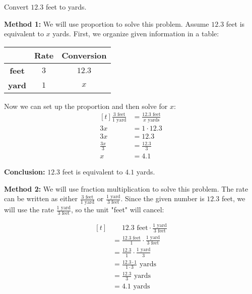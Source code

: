 \begin{myexample}
Convert $12.3$ feet to yards.
\end{myexample}
\begin{solution}
\textbf{Method 1:} We will use proportion to solve this problem. Assume $12.3$ feet is equivalent to $x$ yards. First, we organize given information in a table:
\begin{center}
\begin{tabular}{ | c | c | c | }
	\hline
    	& \textbf{Rate} & \textbf{Conversion} \\ \hline
  \textbf{feet} & $3$ & $12.3$ \\ \hline
  \textbf{yard} & $1$ & $x$ \\ \hline
\end{tabular}
\end{center}

Now we can set up the proportion and then solve for $x$:
\[
\begin{aligned}[t] 
	\frac{3 \text{ feet}}{1 \text{ yard}} &= \frac{12.3 \text{ feet}}{x \text{ yards}} \\
	3x &= 1\cdot12.3 \\ 
	3x &= 12.3 \\
	\frac{3x}{3} &= \frac{12.3}{3} \\ 
	x &= 4.1
\end{aligned}
\]

\textbf{Conclusion:} $12.3$ feet is equivalent to $4.1$ yards.

\textbf{Method 2:} We will use fraction multiplication to solve this problem. The rate can be written as either $\frac{3 \text{ feet}}{1 \text{ yard}}$ or $\frac{1 \text{ yard}}{3 \text{ feet}}$. Since the given number is $12.3$ feet, we will use the rate $\frac{1 \text{ yard}}{3 \text{ feet}}$, so the unit "feet" will cancel:

\[
\begin{aligned}[t]
	&\phantom{{}=}12.3 \text{ feet} \cdot \frac{1 \text{ yard}}{3 \text{ feet}} \\
	&= \frac{12.3 \text{ feet}}{1} \cdot \frac{1 \text{ yard}}{3 \text{ feet}} \\
	&= \frac{12.3}{1} \cdot \frac{1 \text{ yard}}{3} \\
	&= \frac{12.3 \cdot 1}{1 \cdot 3} \text{ yards} \\
	&= \frac{12.3}{3} \text{ yards} \\
	&= 4.1 \text{ yards}
\end{aligned}
\]


\end{solution}
